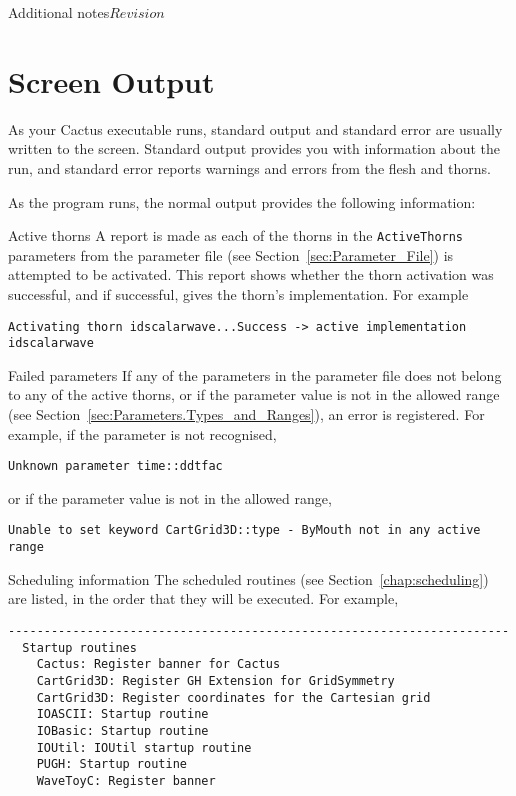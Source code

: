 \begin{cactuspart}{Additional notes}{}{$Revision$}
\section{Screen Output}

As your Cactus executable runs, standard output and standard error
are usually written to the screen. Standard output provides you
with information about the run, and standard error reports warnings
and errors from the flesh and thorns.

As the program runs, the normal output provides the following information:

\begin{Lentry}

\item [Active thorns]
        A report is made as each of the thorns in the \texttt{ActiveThorns}
parameters from the parameter file (see Section~\ref{sec:Parameter_File})
is attempted to be activated. This report
shows whether the thorn activation was successful, and if successful, gives the
thorn's implementation. For example

\begin{verbatim}
Activating thorn idscalarwave...Success -> active implementation idscalarwave
\end{verbatim}

\item [Failed parameters]
         If any of the parameters in the parameter file does not belong to any
of the active thorns, or if the parameter value is not in the allowed range
(see Section~\ref{sec:Parameters.Types_and_Ranges}),
an error is registered. For example, if the parameter is not recognised,

\begin{verbatim}
Unknown parameter time::ddtfac
\end{verbatim}
or if the parameter value is not in the allowed range,

\begin{verbatim}
Unable to set keyword CartGrid3D::type - ByMouth not in any active range
\end{verbatim}

\item [Scheduling information]
        The scheduled routines (see Section~\ref{chap:scheduling})
are listed, in the order that they will be executed. For example,

\begin{verbatim}
----------------------------------------------------------------------
  Startup routines
    Cactus: Register banner for Cactus
    CartGrid3D: Register GH Extension for GridSymmetry
    CartGrid3D: Register coordinates for the Cartesian grid
    IOASCII: Startup routine
    IOBasic: Startup routine
    IOUtil: IOUtil startup routine
    PUGH: Startup routine
    WaveToyC: Register banner


\end{verbatim}
\end{Lentry}
\end{cactuspart}

